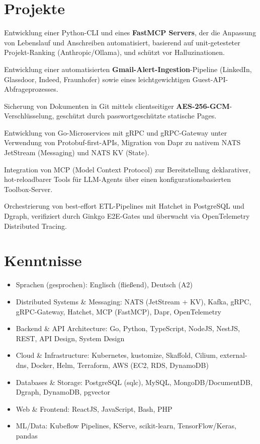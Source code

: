 \documentclass[10pt,a4paper]{resume}
\begin{document}
\section{Projekte}

\bullets
  \item Entwicklung einer Python-CLI und eines \textbf{FastMCP Servers}, der die Anpassung von Lebenslauf und Anschreiben automatisiert, basierend auf unit-getesteter Projekt-Ranking (Anthropic/Ollama), und schützt vor Halluzinationen.
  \item Entwicklung einer automatisierten \textbf{Gmail-Alert-Ingestion}-Pipeline (LinkedIn, Glassdoor, Indeed, Fraunhofer) sowie eines leichtgewichtigen Guest-API-Abfrageprozesses.
  \item Sicherung von Dokumenten in Git mittels clientseitiger \textbf{AES-256-GCM}-Verschlüsselung, geschützt durch passwortgeschützte statische Pages.
\bulletsend
\vspace{1.0pt}
\bullets
  \item Entwicklung von Go-Microservices mit gRPC und gRPC-Gateway unter Verwendung von Protobuf-first-APIs, Migration von Dapr zu nativem NATS JetStream (Messaging) und NATS KV (State).
  \item Integration von MCP (Model Context Protocol) zur Bereitstellung deklarativer, hot-reloadbarer Tools für LLM-Agents über einen konfigurationsbasierten Toolbox-Server.
  \item Orchestrierung von best-effort ETL-Pipelines mit Hatchet in PostgreSQL und Dgraph, verifiziert durch Ginkgo E2E-Gates und überwacht via OpenTelemetry Distributed Tracing.
\bulletsend

\section{Kenntnisse}

\begin{itemize}[leftmargin=1.4em,nosep,topsep=2pt]
  \item Sprachen (gesprochen): Englisch (fließend), Deutsch (A2)
  \item Distributed Systems \& Messaging: NATS (JetStream + KV), Kafka, gRPC, gRPC-Gateway, Hatchet, MCP (FastMCP), Dapr, OpenTelemetry
  \item Backend \& API Architecture: Go, Python, TypeScript, NodeJS, NestJS, REST, API Design, System Design
  \item Cloud \& Infrastructure: Kubernetes, kustomize, Skaffold, Cilium, external-dns, Docker, Helm, Terraform, AWS (EC2, RDS, DynamoDB)
  \item Databases \& Storage: PostgreSQL (sqlc), MySQL, MongoDB/DocumentDB, Dgraph, DynamoDB, pgvector
  \item Web \& Frontend: ReactJS, JavaScript, Bash, PHP
  \item ML/Data: Kubeflow Pipelines, KServe, scikit-learn, TensorFlow/Keras, pandas
\end{itemize}
\end{document}

